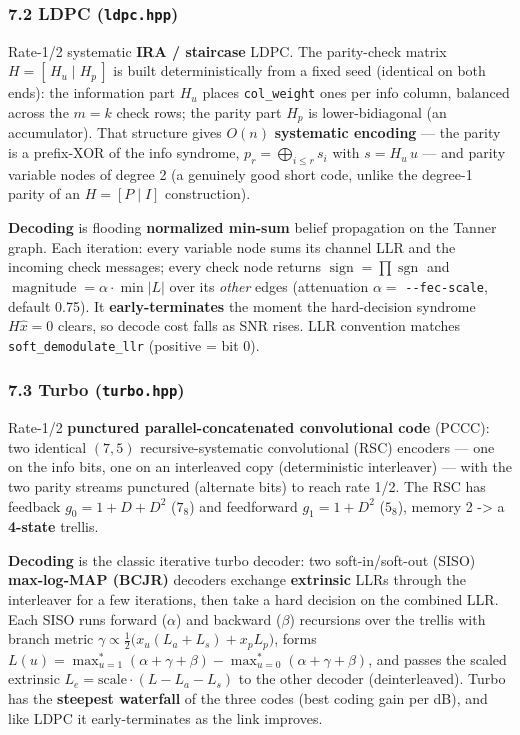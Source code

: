 \documentclass[
  10pt,
]{article}
\begin{document}
\hypertarget{72-ldpc-ldpchpp}{%
\subsubsection{\texorpdfstring{7.2 LDPC
(\texttt{ldpc.hpp})}{7.2 LDPC (ldpc.hpp)}}\label{72-ldpc-ldpchpp}}

Rate-1/2 systematic \textbf{IRA / staircase} LDPC. The parity-check
matrix \(H = [\,H_u \mid H_p\,]\) is built deterministically from a
fixed seed (identical on both ends): the information part \(H_u\) places
\texttt{col\_weight} ones per info column, balanced across the \(m=k\)
check rows; the parity part \(H_p\) is lower-bidiagonal (an
accumulator). That structure gives \(O(n)\) \textbf{systematic encoding}
--- the parity is a prefix-XOR of the info syndrome,
\(p_r = \bigoplus_{i \le r} s_i\) with \(s = H_u\,u\) --- and parity
variable nodes of degree 2 (a genuinely good short code, unlike the
degree-1 parity of an \(H=[P\mid I]\) construction).

\textbf{Decoding} is flooding \textbf{normalized min-sum} belief
propagation on the Tanner graph. Each iteration: every variable node
sums its channel LLR and the incoming check messages; every check node
returns \(\operatorname{sign} = \prod \operatorname{sgn}\) and
\(\operatorname{magnitude} =
\alpha \cdot \min |L|\) over its \emph{other} edges (attenuation
\(\alpha =\) \texttt{-\/-fec-scale}, default 0.75). It
\textbf{early-terminates} the moment the hard-decision syndrome
\(H\hat{x}=0\) clears, so decode cost falls as SNR rises. LLR convention
matches \texttt{soft\_demodulate\_llr} (positive = bit 0).

\hypertarget{73-turbo-turbohpp}{%
\subsubsection{\texorpdfstring{7.3 Turbo
(\texttt{turbo.hpp})}{7.3 Turbo (turbo.hpp)}}\label{73-turbo-turbohpp}}

Rate-1/2 \textbf{punctured parallel-concatenated convolutional code}
(PCCC): two identical \((7,5)\) recursive-systematic convolutional (RSC)
encoders --- one on the info bits, one on an interleaved copy
(deterministic interleaver) --- with the two parity streams punctured
(alternate bits) to reach rate 1/2. The RSC has feedback
\(g_0 = 1+D+D^2\) (\(7_8\)) and feedforward \(g_1 = 1+D^2\) (\(5_8\)),
memory 2 -\textgreater{} a \textbf{4-state} trellis.

\textbf{Decoding} is the classic iterative turbo decoder: two
soft-in/soft-out (SISO) \textbf{max-log-MAP (BCJR)} decoders exchange
\textbf{extrinsic} LLRs through the interleaver for a few iterations,
then take a hard decision on the combined LLR. Each SISO runs forward
(\(\alpha\)) and backward (\(\beta\)) recursions over the trellis with
branch metric
\(\gamma \propto \tfrac12\big(x_u(L_a+L_s) + x_p L_p\big)\), forms
\(L(u) = \max^{*}_{u=1}(\alpha+\gamma+\beta) - \max^{*}_{u=0}(\alpha+\gamma+\beta)\),
and passes the scaled extrinsic
\(L_e = \text{scale}\cdot(L - L_a - L_s)\) to the other decoder
(deinterleaved). Turbo has the \textbf{steepest waterfall} of the three
codes (best coding gain per dB), and like LDPC it early-terminates as
the link improves.
\end{document}
